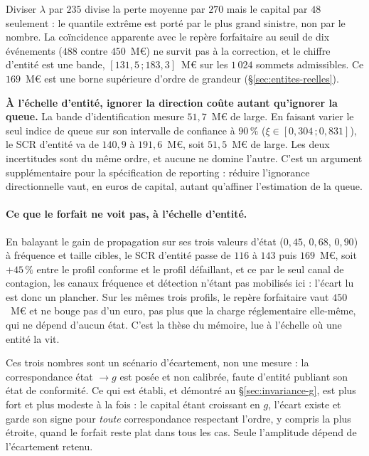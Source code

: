 Diviser $\lambda$ par $235$ divise la perte moyenne par $270$ mais le capital par $48$ seulement :
le quantile extrême est porté par le plus grand sinistre, non par le nombre. La coïncidence
apparente avec le repère forfaitaire au seuil de dix événements ($488$ contre $450$~M\euro) ne
survit pas à la correction, et le chiffre d'entité est une bande, $[131{,}5\,;183{,}3]$~M\euro{}
sur les $1\,024$ sommets admissibles. Ce $169$~M\euro{} est une borne supérieure d'ordre de
grandeur (\S\ref{sec:entites-reelles}).

\begin{cle}
\textbf{À l'échelle d'entité, ignorer la direction coûte autant qu'ignorer la queue.} La
bande d'identification mesure $51{,}7$~M\euro{} de large. En faisant varier le seul indice de
queue sur son intervalle de confiance à $90\,\%$ ($\xi \in [0{,}304\,;0{,}831]$), le SCR
d'entité va de $140{,}9$ à $191{,}6$~M\euro, soit $51{,}5$~M\euro{} de large. Les deux
incertitudes sont du même ordre, et aucune ne domine l'autre. C'est un argument
supplémentaire pour la spécification de reporting : réduire l'ignorance directionnelle vaut,
en euros de capital, autant qu'affiner l'estimation de la queue.
\end{cle}

\paragraph{Ce que le forfait ne voit pas, à l'échelle d'entité.} En balayant le gain de
propagation sur ses trois valeurs d'état ($0{,}45$, $0{,}68$, $0{,}90$) à fréquence et taille
cibles, le SCR d'entité passe de $116$ à $143$ puis $169$~M\euro{}, soit $+45\,\%$ entre le
profil conforme et le profil défaillant, et ce par le seul canal de contagion, les canaux
fréquence et détection n'étant pas mobilisés ici : l'écart lu est donc un plancher. Sur les
mêmes trois profils, le repère forfaitaire vaut $450$~M\euro{} et ne bouge pas d'un euro, pas
plus que la charge réglementaire elle-même, qui ne dépend d'aucun état. C'est la thèse du
mémoire, lue à l'échelle où une entité la vit.

Ces trois nombres sont un scénario d'écartement, non une mesure : la correspondance
état $\to g$ est posée et non calibrée, faute d'entité publiant son état de conformité. Ce qui
est établi, et démontré au \S\ref{sec:invariance-g}, est plus fort et plus modeste à la fois :
le capital étant croissant en $g$, l'écart existe et garde son signe pour \emph{toute}
correspondance respectant l'ordre, y compris la plus étroite, quand le forfait reste plat dans
tous les cas. Seule l'amplitude dépend de l'écartement retenu.

